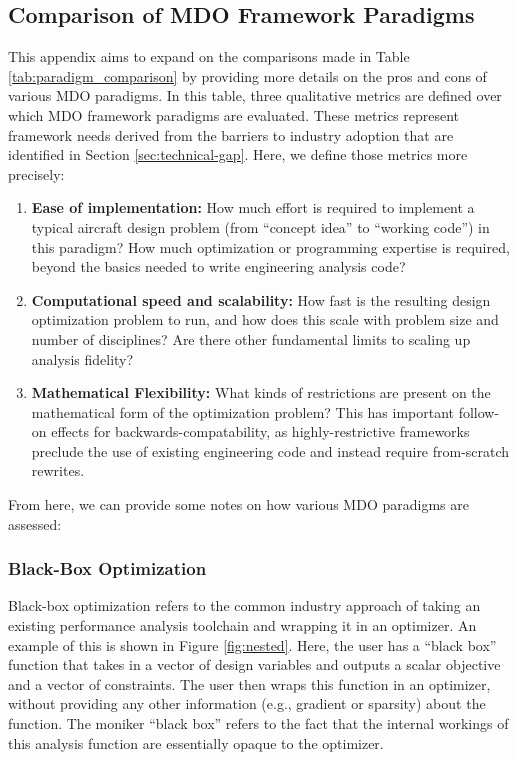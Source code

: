 \documentclass[12pt,vi,oneside]{report}
\begin{document}
    \begin{appendices}
        \chapter{Comparison of MDO Framework Paradigms}
        \label{sec:paradigm_comparison}

        This appendix aims to expand on the comparisons made in Table \ref{tab:paradigm_comparison} by providing more details on the pros and cons of various MDO paradigms. In this table, three qualitative metrics are defined over which MDO framework paradigms are evaluated. These metrics represent framework needs derived from the barriers to industry adoption that are identified in Section \ref{sec:technical-gap}. Here, we define those metrics more precisely:

        \begin{enumerate}
            \item \textbf{Ease of implementation:} How much effort is required to implement a typical aircraft design problem (from ``concept idea'' to ``working code'') in this paradigm? How much optimization or programming expertise is required, beyond the basics needed to write engineering analysis code?
            \item \textbf{Computational speed and scalability:} How fast is the resulting design optimization problem to run, and how does this scale with problem size and number of disciplines? Are there other fundamental limits to scaling up analysis fidelity?
            \item \textbf{Mathematical Flexibility:} What kinds of restrictions are present on the mathematical form of the optimization problem? This has important follow-on effects for backwards-compatability, as highly-restrictive frameworks preclude the use of existing engineering code and instead require from-scratch rewrites.
        \end{enumerate}

        From here, we can provide some notes on how various MDO paradigms are assessed:

        \subsection*{Black-Box Optimization}

        Black-box optimization refers to the common industry approach of taking an existing performance analysis toolchain and wrapping it in an optimizer. An example of this is shown in Figure \ref{fig:nested}. Here, the user has a ``black box'' function that takes in a vector of design variables and outputs a scalar objective and a vector of constraints. The user then wraps this function in an optimizer, without providing any other information (e.g., gradient or sparsity) about the function. The moniker ``black box'' refers to the fact that the internal workings of this analysis function are essentially opaque to the optimizer.


\end{appendices}
\end{document}
